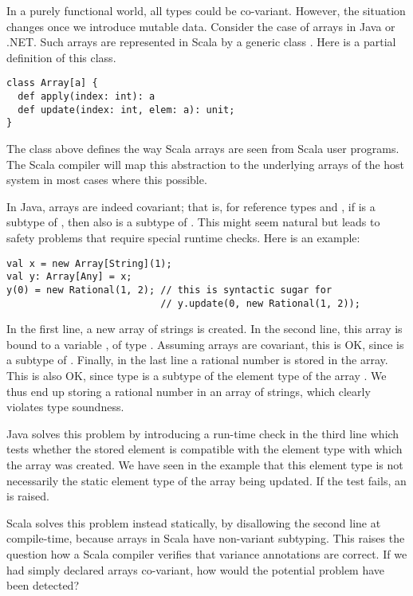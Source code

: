In a purely functional world, all types could be co-variant. However,
the situation changes once we introduce mutable data. Consider the
case of arrays in Java or .NET. Such arrays are represented in Scala
by a generic class . Here is a partial definition of this
class.
\begin{lstlisting}
class Array[a] {
  def apply(index: int): a
  def update(index: int, elem: a): unit;
}
\end{lstlisting}
The class above defines the way Scala arrays are seen from Scala user
programs. The Scala compiler will map this abstraction to the
underlying arrays of the host system in most cases where this
possible.

In Java, arrays are indeed covariant; that is, for reference types
 and , if  is a subtype of , then also
 is a subtype of . This might seem
natural but leads to safety problems that require special runtime
checks. Here is an example:
\begin{lstlisting}
val x = new Array[String](1);
val y: Array[Any] = x;
y(0) = new Rational(1, 2); // this is syntactic sugar for 
                           // y.update(0, new Rational(1, 2));
\end{lstlisting}
In the first line, a new array of strings is created. In the second
line, this array is bound to a variable , of type
.  Assuming arrays are covariant, this is OK, since
 is a subtype of . Finally, in
the last line a rational number is stored in the array. This is also
OK, since type  is a subtype of the element type
 of the array . We thus end up storing a rational
number in an array of strings, which clearly violates type soundness. 

Java solves this problem by introducing a run-time check in the third
line which tests whether the stored element is compatible with the
element type with which the array was created. We have seen in the
example that this element type is not necessarily the static element
type of the array being updated. If the test fails, an
 is raised.

Scala solves this problem instead statically, by disallowing the
second line at compile-time, because arrays in Scala have non-variant
subtyping. This raises the question how a Scala compiler verifies that
variance annotations are correct. If we had simply declared arrays
co-variant, how would the potential problem have been detected?

